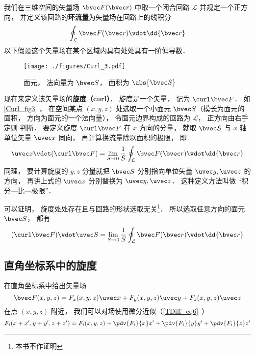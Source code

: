 
我们在三维空间的矢量场 $\bvec F(\bvec r)$ 中取一个闭合回路 $\mathcal L$ 并规定一个正方向， 并定义该回路的\textbf{环流量}为矢量场在回路上的线积分
\begin{equation}
\oint_{\mathcal L} \bvec F(\bvec r) \vdot \dd{\bvec r}
\end{equation}
以下假设这个矢量场在某个区域内具有处处具有一阶偏导数．

\begin{figure}[ht]
\centering
\texttt{[image: ./figures/Curl\_3.pdf]}
\caption{面元， 法向量为 $\bvec S$， 面积为 $\abs{\bvec S}$}\label{Curl_fig3}
\end{figure}

现在来定义该矢量场的\textbf{旋度（curl）}． 旋度是一个矢量， 记为 $\curl \bvec F$． 如\autoref{Curl_fig3} ， 在空间某点 $(x,y,z)$ 处选取一个小面元 $\bvec S$（模长为面元的面积， 方向为面元的一个法向量）， 令面元边界构成的回路为 $\mathcal L$， 正方向由右手定则 判断． 要定义旋度 $\curl \bvec F$ 在 $x$ 方向的分量， 就取 $\bvec S$ 与 $x$ 轴单位矢量 $\uvec x$ 同向， 再计算换流量除以面积的极限， 即
\begin{equation}
\uvec x \vdot (\curl\bvec F) = \lim_{S\to 0} \frac 1S \oint_{\mathcal L} \bvec F(\bvec r) \vdot \dd{\bvec r}
\end{equation}
同理， 要计算旋度的 $y, z$ 分量就把 $\bvec S$ 分别指向单位矢量 $\uvec y, \uvec z$ 的方向， 再讲上式的 $\uvec x$ 分别替换为 $\uvec y, \uvec z$． 这种定义方法叫做 “积分—比—极限”．

可以证明， 旋度处处存在且与回路的形状选取无关\footnote{本书不作证明}． 所以选取任意方向的面元 $\bvec S$， 都有
\begin{equation}\label{Curl_eq3}
(\curl\bvec F) \vdot \uvec S = \lim_{S\to 0} \frac 1S \oint_{\mathcal L} \bvec F(\bvec r) \vdot \dd{\bvec r}
\end{equation}

\subsection{直角坐标系中的旋度}
在直角坐标系中给出矢量场
\begin{equation}
\bvec F(x,y,z) = F_x(x,y,z)\uvec x + F_y(x,y,z)\uvec y + F_z(x,y,z)\uvec z
\end{equation}
在点 $(x,y,z)$ 附近， 我们可以对场使用微分近似（\autoref{TDiff_eq6}~）
\begin{equation}
F_i(x+x', y+y', z+z') = F_i(x,y,z) + \pdv{F_i}{x}x' + \pdv{F_i}{y}y' + \pdv{F_i}{z}z'
\end{equation}

